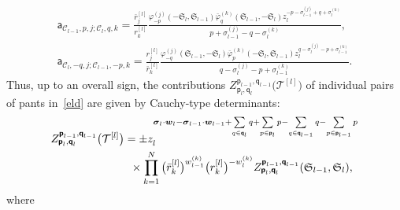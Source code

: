 \documentclass[pdftex]{sigma}
\numberwithin{equation}{section}
\begin{document}
\begin{gather}
\mathsf a_{\mathcal C_{l-1},p,j;\mathcal C_{l},q,k}= \frac{\bar r^{[l]}_j}{ r^{[l]}_k} \frac{\varphi_{-p}^{(j)}(-\mathfrak S_l,\mathfrak S_{l-1})
\bar\varphi_{q}^{(k)}(\mathfrak S_{l-1},-\mathfrak S_l) z_l^{-p-\sigma_{l-1}^{(j)}+q+\sigma_{l}^{(k)}}}{p+\sigma_{l-1}^{(j)}-q-\sigma_{l}^{(k)}}, \nonumber\\
\mathsf a_{\mathcal C_{l},-q,j;\mathcal C_{l-1},-p,k}= \frac{ r^{[l]}_j}{\bar r^{[l]}_k}\frac{\varphi_{-q}^{(j)}(\mathfrak S_{l-1},-\mathfrak S_l) \bar\varphi_{p}^{(k)} (-\mathfrak S_l,\mathfrak S_{l-1}) z_l^{q-\sigma_{l}^{(j)}-p+\sigma_{l-1}^{(k)}}}{q-\sigma_{l}^{(j)}-p+\sigma_{l-1}^{(k)}} .\label{cael2}
\end{gather}
Thus, up to an overall sign, the contributions $ Z^{\boldsymbol{\mathsf p}_{l-1},\boldsymbol{\mathsf q}_{l-1}}_{\boldsymbol{\mathsf p}_{l},\boldsymbol{\mathsf q}_{l}}\big(\mathcal T^{[l]}\big) $ of individual pairs of pants in~\eqref{eld} are given by Cauchy-type determinants:
\begin{gather}
Z^{\boldsymbol{\mathsf p}_{l-1},\boldsymbol{\mathsf q}_{l-1}}_{\boldsymbol{\mathsf p}_{l},\boldsymbol{\mathsf q}_{l}}\big(\mathcal T^{[l]}\big) =
\pm z_l^{\boldsymbol{\sigma}_l\cdot\boldsymbol{w}_l-\boldsymbol{\sigma}_{l-1}\cdot\boldsymbol{w}_{l-1}+\sum\limits_{q\in\boldsymbol{\mathsf q}_{l}} q+\sum\limits_{p\in\boldsymbol{\mathsf p}_{l}} p-\sum\limits_{q\in\boldsymbol{\mathsf q}_{l-1}}q-\sum\limits_{p\in\boldsymbol{\mathsf p}_{l-1}}p }
\nonumber\\
\hphantom{Z^{\boldsymbol{\mathsf p}_{l-1},\boldsymbol{\mathsf q}_{l-1}}_{\boldsymbol{\mathsf p}_{l},\boldsymbol{\mathsf q}_{l}}\big(\mathcal T^{[l]}\big)}{} \times
\prod_{k=1}^N\big(\bar r_k^{[l]}\big)^{w^{(k)}_{l-1}}\big( r_k^{[l]}\big)^{-w^{(k)}_{l}} Z^{\boldsymbol{\mathsf p}_{l-1},\boldsymbol{\mathsf q}_{l-1}}_{\boldsymbol{\mathsf p}_{l},\boldsymbol{\mathsf q}_{l}} (\mathfrak S_{l-1},\mathfrak S_l ),\label{detzpq}
\end{gather}
where
\end{document}
